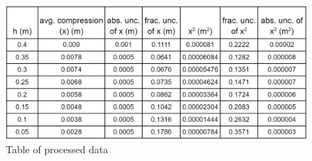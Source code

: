 \FloatBarrier
\begin{figure}
    \includegraphics[width = \textwidth]{proctbl.png}
    \caption{Table of processed data}
\end{figure}
\FloatBarrier